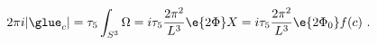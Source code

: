 \begin{equation}
\label{gluino_cond}
  2\pi i |\glue_c| = \tau_5 \int_{S^3} \Omega =
  i \tau_5 \frac{2\pi^2}{L^3} \e{2\Phi} X 
  = i \tau_5 \frac{2\pi^2}{L^3} \e{2\Phi_0} f(c)~. 
\end{equation}


